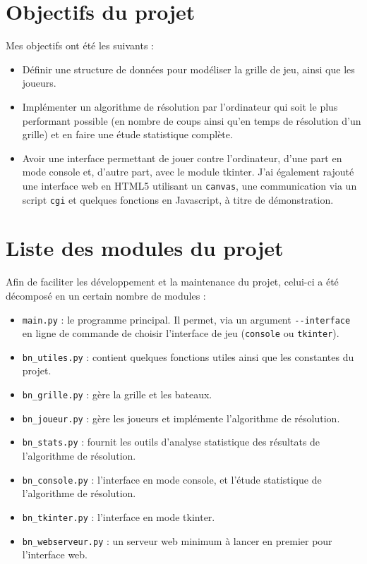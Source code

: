 \section{Objectifs du projet}
Mes objectifs ont été les suivants :
\begin{itemize}
\item Définir une structure de données pour modéliser la grille de jeu, ainsi que les joueurs.
\item Implémenter un algorithme de résolution par l'ordinateur qui soit le plus performant possible (en nombre de coups ainsi qu'en temps de résolution d'un grille) et en faire une étude statistique complète.
\item Avoir une interface permettant de jouer contre l'ordinateur, d'une part en mode console et, d'autre part, avec le module tkinter. J'ai également rajouté une interface web en HTML5 utilisant un \texttt{canvas}, une communication via un script \texttt{cgi} et quelques fonctions en Javascript, à titre de démonstration.
\end{itemize}

\section{Liste des modules du projet}
Afin de faciliter les développement et la maintenance du projet, celui-ci a été décomposé en un certain nombre de modules :
\begin{itemize}
\item \texttt{main.py} : le programme principal. Il permet, via un argument \texttt{-\hspace*{1pt}-interface} en ligne de commande de choisir l'interface de jeu (\texttt{console} ou \texttt{tkinter}).
\item \texttt{bn\_utiles.py} : contient quelques fonctions utiles ainsi que les constantes du projet.
\item \texttt{bn\_grille.py} : gère la grille et les bateaux.
\item \texttt{bn\_joueur.py} : gère les joueurs et implémente l'algorithme de résolution.
\item \texttt{bn\_stats.py} : fournit les outils d'analyse statistique des résultats de l'algorithme de résolution.
\item \texttt{bn\_console.py} : l'interface en mode console, et l'étude statistique de l'algorithme de résolution.
\item \texttt{bn\_tkinter.py} : l'interface en mode tkinter.
\item \texttt{bn\_webserveur.py} : un serveur web minimum à lancer en premier pour l'interface web.
\end{itemize}

